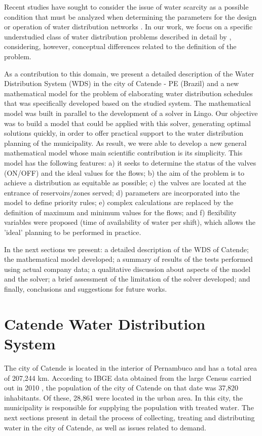 \documentclass{singlecol}
\theoremstyle{TH}{
\newtheorem{lemma}{Lemma}
\newtheorem{theorem}[lemma]{Theorem}
\newtheorem{corrolary}[lemma]{Corrolary}
\newtheorem{conjecture}[lemma]{Conjecture}
\newtheorem{proposition}[lemma]{Proposition}
\newtheorem{claim}[lemma]{Claim}
\newtheorem{stheorem}[lemma]{Wrong Theorem}
\newtheorem{algorithm}{Algorithm}
}
\theoremstyle{THrm}{
\newtheorem{definition}{Definition}[section]
\newtheorem{question}{Question}[section]
\newtheorem{remark}{Remark}
\newtheorem{scheme}{Scheme}
}
\theoremstyle{THhit}{
\newtheorem{case}{Case}[section]
}
\begin{document}
Recent studies have sought to consider the issue of water scarcity as a possible condition that must be analyzed when determining the parameters for the design or operation of water distribution networks \citep{SankarEtAl2015}. In our work, we focus on a specific understudied class of water distribution problems described in detail by \cite{KurianEtAl2018}, considering, however, conceptual differences related to the definition of the problem.

As a contribution to this domain, we present a detailed description of the Water Distribution System (WDS) in the city of Catende - PE (Brazil) and a new mathematical model for the problem of elaborating water distribution schedules that was specifically developed based on the studied system. The mathematical model was built in parallel to the development of a solver in Lingo. Our objective was to build a model that could be applied with this solver, generating optimal solutions quickly, in order to offer practical support to the water distribution planning of the municipality. As result, we were able to develop a new general mathematical model whose main scientific contribution is its simplicity. This model has the following features: a) it seeks to determine the status of the valves (ON/OFF) and the ideal values for the flows; b) the aim of the problem is to achieve a distribution as equitable as possible; c) the valves are located at the entrance of reservoirs/zones served; d) parameters are incorporated into the model to define priority rules; e) complex calculations are replaced by the definition of maximum and minimum values for the flows; and f) flexibility variables were proposed (time of availability of water per shift), which allows the 'ideal' planning to be performed in practice. 

In the next sections we present: a detailed description of the WDS of Catende; the mathematical model developed; a summary of results of the tests performed using actual company data; a qualitative discussion about aspects of the model and the solver; a brief assessment of the limitation of the solver developed; and finally, conclusions and suggestions for future works. 

\section{Catende Water Distribution System}
\label{sec:CatendeWDS}

The city of Catende is located in the interior of Pernambuco and has a total area of 207,244 km. According to IBGE data obtained from the large Census carried out in 2010 \citep{IBGECatende}, the population of the city of Catende on that date was 37,820 inhabitants. Of these, 28,861 were located in the urban area. In this city, the municipality is responsible for supplying the population with treated water. The next sections present in detail the process of collecting, treating and distributing water in the city of Catende, as well as issues related to demand. 
\end{document}
